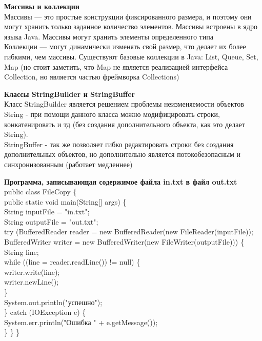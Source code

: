 \documentclass{article}
\begin{document}
\begin{minipage}{.3\textwidth}
    \textbf{Массивы и коллекции}\\
    Массивы — это простые конструкции фиксированного размера, и поэтому они могут 
    хранить только заданное количество элементов. Массивы встроены в ядро языка Java. 
    Массивы могут хранить элементы определенного типа \\
    Коллекции — могут динамически изменять свой размер, что делает их более гибкими, чем массивы. Существуют базовые коллекции в Java:
List, 
Queue, 
Set, 
Map (но стоит заметить, что Map не является реализацией интерфейса Collection, но является частью фреймворка Collections)
    
\end{minipage}
\hfill
\begin{minipage}{.3\textwidth}
    \textbf{Классы StringBuilder и StringBuffer}\\
    Класс StringBuilder является решением проблемы неизменяемости объектов String - при помощи данного класса 
    можно модифицировать строки, конкатенировать и тд (без создания дополнительного объекта, как это делает String).\\
    StringBuffer - так же позволяет гибко редактировать строки без создания дополнительных объектов, но дополнительно является потокобезопасным и синхронизованным (работает медленнее)
\end{minipage}
\hfill
\begin{minipage}{.3\textwidth}
    \textbf{Программа, записывающая содержимое файла in.txt в файл out.txt}\\
    public class FileCopy \{\\
    public static void main(String[] args) \{\\
        String inputFile = "in.txt";\\
        String outputFile = "out.txt";\\
        try (BufferedReader reader = new BufferedReader(new FileReader(inputFile));\\
             BufferedWriter writer = new BufferedWriter(new FileWriter(outputFile))) \{\\
            String line;\\
            while ((line = reader.readLine()) != null) \{\\
                writer.write(line);\\
                writer.newLine();\\
            \}\\
            System.out.println("успешно");\\
        \} catch (IOException e) \{\\
            System.err.println("Ошибка " + e.getMessage());\\
        \}
    \}
\}

\end{minipage}
\end{document}
